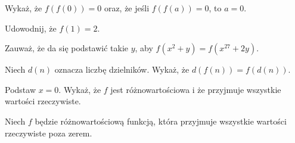 
\begin{hints_list}
	\item Wykaż, że $f(f(0)) = 0$ oraz, że jeśli $f(f(a)) = 0$, to $a = 0$.
	\item Udowodnij, że $f(1) = 2$.
	\item Zauważ, że da się podstawić takie $y$, aby $f(x^2 + y) = f(x^{27} + 2y)$.
	\item Niech $d(n)$ oznacza liczbę dzielników. Wykaż, że $d(f(n)) = f(d(n))$.
	\item Podstaw $x = 0$. Wykaż, że $f$ jest różnowartościowa i że przyjmuje wszystkie wartości rzeczywiste.
	\item Niech $f$ będzie różnowartościową funkcją, która przyjmuje wszystkie wartości rzeczywiste poza zerem.
\end{hints_list}